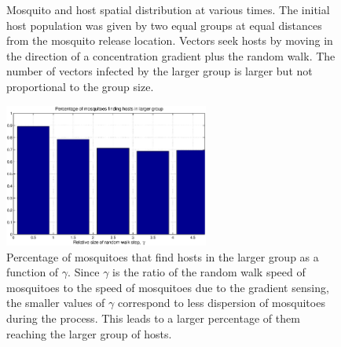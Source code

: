 \documentclass[11pt]{article}
\begin{document}
\begin{figure}[hbtp]
     \caption{Mosquito and host spatial distribution at various times. The initial host population
was given by two equal groups at equal distances from the mosquito release location.  Vectors seek hosts by moving
in the direction of a concentration gradient plus the random walk. The number of
vectors infected by the larger group is larger but not proportional to the group size.}
     \label{fig:ex1a}
\end{figure}


\begin{figure}[hbtp]
\centering
\includegraphics[width=0.6\textwidth]{figures/Gamma_vary.eps}
\caption{Percentage of mosquitoes that find hosts in the larger group as a function of $\gamma$.
Since $\gamma$ is the ratio of the random walk speed of mosquitoes to the speed of mosquitoes
due to the gradient sensing, the smaller values of $\gamma$ correspond to less dispersion of
mosquitoes during the process. This leads to a larger percentage of them reaching the larger
group of hosts.}
\end{figure}
\end{document}
